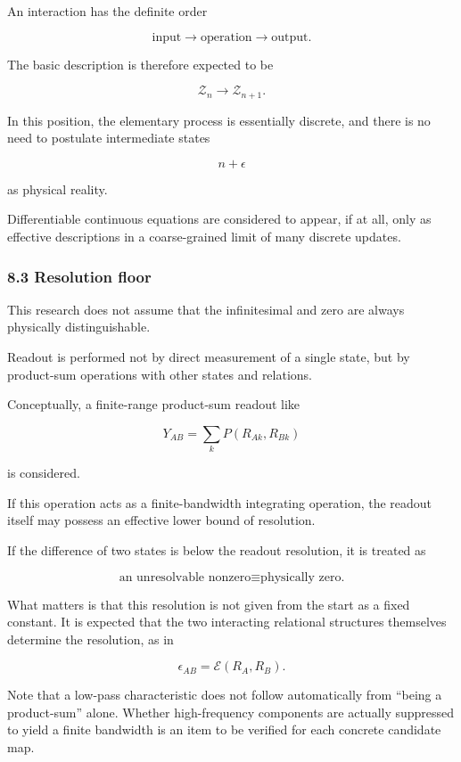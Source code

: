 \documentclass[
  a4paper,
]{article}
\begin{document}
An interaction has the definite order

\[
\text{input}
\rightarrow
\text{operation}
\rightarrow
\text{output}.
\]

The basic description is therefore expected to be

\[
\boxed{
\mathcal Z_n\rightarrow\mathcal Z_{n+1}.
}
\]

In this position, the elementary process is essentially discrete, and
there is no need to postulate intermediate states

\[
n+\epsilon
\]

as physical reality.

Differentiable continuous equations are considered to appear, if at all,
only as effective descriptions in a coarse-grained limit of many
discrete updates.

\subsubsection{8.3 Resolution floor}\label{resolution-floor}

This research does not assume that the infinitesimal and zero are always
physically distinguishable.

Readout is performed not by direct measurement of a single state, but by
product-sum operations with other states and relations.

Conceptually, a finite-range product-sum readout like

\[
Y_{AB}
=
\sum_k P(R_{Ak},R_{Bk})
\]

is considered.

If this operation acts as a finite-bandwidth integrating operation, the
readout itself may possess an effective lower bound of resolution.

If the difference of two states is below the readout resolution, it is
treated as

\[
\boxed{
\text{an unresolvable nonzero}\equiv\text{physically zero.}
}
\]

What matters is that this resolution is not given from the start as a
fixed constant. It is expected that the two interacting relational
structures themselves determine the resolution, as in

\[
\boxed{
\epsilon_{AB}=\mathcal E(R_A,R_B).
}
\]

Note that a low-pass characteristic does not follow automatically from
``being a product-sum'' alone. Whether high-frequency components are
actually suppressed to yield a finite bandwidth is an item to be
verified for each concrete candidate map.
\end{document}
